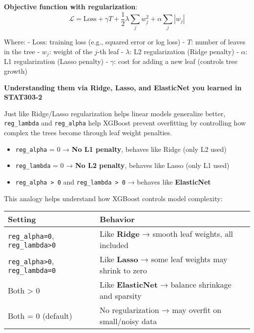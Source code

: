 \documentclass[
  letterpaper,
  DIV=11,
  numbers=noendperiod]{scrreprt}
\providecommand{\tightlist}{%
  \setlength{\itemsep}{0pt}\setlength{\parskip}{0pt}}\usepackage{longtable,booktabs,array}
\begin{document}
\textbf{Objective function with regularization}: \[
\mathcal{L} = \text{Loss} + \gamma T + \frac{1}{2} \lambda \sum_j w_j^2 + \alpha \sum_j |w_j|
\]

Where: - \(\text{Loss}\): training loss (e.g., squared error or log
loss) - \(T\): number of leaves in the tree - \(w_j\): weight of the
\(j\)-th leaf - \(\lambda\): L2 regularization (Ridge penalty) -
\(\alpha\): L1 regularization (Lasso penalty) - \(\gamma\): cost for
adding a new leaf (controls tree growth)

\textbf{Understanding them via Ridge, Lasso, and ElasticNet you learned
in STAT303-2}

Just like Ridge/Lasso regularization helps linear models generalize
better, \texttt{reg\_lambda} and \texttt{reg\_alpha} help XGBoost
prevent overfitting by controlling how complex the trees become through
leaf weight penalties.

\begin{itemize}
\tightlist
\item
  \texttt{reg\_alpha} = 0 → \textbf{No L1 penalty}, behaves like Ridge
  (only L2 used)
\item
  \texttt{reg\_lambda} = 0 → \textbf{No L2 penalty}, behaves like Lasso
  (only L1 used)
\item
  \texttt{reg\_alpha\ \textgreater{}\ 0} and
  \texttt{reg\_lambda\ \textgreater{}\ 0} → behaves like
  \textbf{ElasticNet}
\end{itemize}

This analogy helps understand how XGBoost controls model complexity:

\begin{longtable}[]{@{}
  >{\raggedright\arraybackslash}p{}
  >{\raggedright\arraybackslash}p{}@{}}
\toprule\noalign{}
\begin{minipage}[b]{\linewidth}\raggedright
Setting
\end{minipage} & \begin{minipage}[b]{\linewidth}\raggedright
Behavior
\end{minipage} \\
\midrule\noalign{}
\endhead
\bottomrule\noalign{}
\endlastfoot
\texttt{reg\_alpha=0}, \texttt{reg\_lambda\textgreater{}0} & Like
\textbf{Ridge} → smooth leaf weights, all included \\
\texttt{reg\_alpha\textgreater{}0}, \texttt{reg\_lambda=0} & Like
\textbf{Lasso} → some leaf weights may shrink to zero \\
Both \textgreater{} 0 & Like \textbf{ElasticNet} → balance shrinkage and
sparsity \\
Both = 0 (default) & No regularization → may overfit on small/noisy
data \\
\end{longtable}
\end{document}
